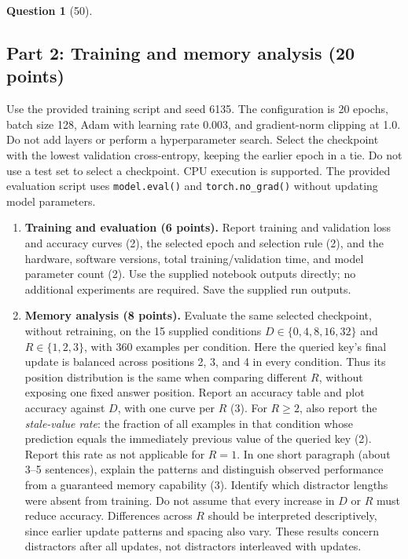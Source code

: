 \documentclass[12pt]{article}
\theoremstyle{definition}
\newtheorem{exercise}{Question}%
\begin{document}
\begin{exercise}[50]
{\subsection*{Part 2: Training and memory analysis (20 points)}
Use the provided training script and seed 6135. The configuration is
20 epochs, batch size 128, Adam with learning rate 0.003, and gradient-norm
clipping at 1.0. Do not add layers or perform a hyperparameter search.
Select the checkpoint with the lowest validation cross-entropy, keeping
the earlier epoch in a tie. Do not use a test set to select a checkpoint.
CPU execution is supported. The provided evaluation script uses \texttt{model.eval()} and \texttt{torch.no\_grad()} without updating model parameters.

\begin{enumerate}
\item \textbf{Training and evaluation (6 points).} Report training and
validation loss and accuracy curves (2), the selected epoch and selection
rule (2), and the hardware, software versions, total training/validation
time, and model parameter count (2). Use the supplied notebook outputs directly; no additional experiments are required. Save the supplied run outputs.

\item \textbf{Memory analysis (8 points).} Evaluate the same selected
checkpoint, without retraining, on the 15 supplied conditions
$D\in\{0,4,8,16,32\}$ and $R\in\{1,2,3\}$, with 360 examples per
condition. Here the queried key's final update is balanced across positions
2, 3, and 4 in every condition. Thus its position distribution is the same
when comparing different $R$, without exposing one fixed answer position.
Report an accuracy table and plot accuracy
against $D$, with one curve per $R$ (3). For $R\geq2$, also report the
\emph{stale-value rate}: the fraction of all examples in that condition
whose prediction equals the immediately previous value of the queried key
(2). Report this rate as not applicable for $R=1$.
In one short paragraph (about 3--5 sentences), explain the patterns and distinguish observed performance from a guaranteed
memory capability (3). Identify which distractor lengths were absent from
training. Do not assume that every increase in $D$ or $R$ must reduce accuracy. Differences across $R$ should be interpreted descriptively, since earlier update patterns and spacing also vary. These results concern distractors after all updates, not distractors interleaved with updates.


\end{enumerate}}
\end{exercise}
\end{document}

